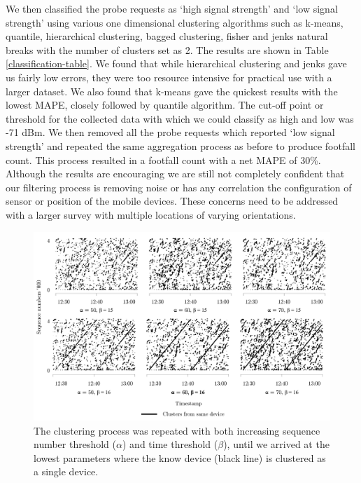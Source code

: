 We then classified the probe requests as `high signal strength' and `low signal
strength' using various one dimensional clustering algorithms such as k-means,
quantile, hierarchical clustering, bagged clustering, fisher and jenks natural
breaks with the number of clusters set as 2. The results are shown in Table
\ref{classification-table}. We found that while hierarchical clustering and
jenks gave us fairly low errors, they were too resource intensive for practical
use with a larger dataset. We also found that k-means gave the quickest results
with the lowest MAPE, closely followed by quantile algorithm. The cut-off point
or threshold for the collected data with which we could classify as high and
low was -71 dBm. We then removed all the probe requests which reported `low
signal strength' and repeated the same aggregation process as before to produce
footfall count. This process resulted in a footfall count with a net MAPE of
30\%. Although the results are encouraging we are still not completely
confident that our filtering process is removing noise or has any correlation
the configuration of sensor or position of the mobile devices. These concerns
need to be addressed with a larger survey with multiple locations of varying
orientations.

\begin{figure}
\begin{center}
\vspace{10pt}
\includegraphics [width=0.85\linewidth,trim=10 15 10 15,clip]
    {images/pilot_clustering_params_rev.png}
\caption{The clustering process was repeated with both increasing sequence
    number threshold ($\alpha$) and time threshold ($\beta$), until we arrived
    at the lowest parameters where the know device (black line) is clustered as
    a single device.}
\label{pilot_clustering_params}
\end{center}
\end{figure}

